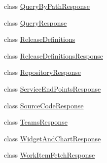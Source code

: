 \begin{DoxyCompactItemize}
\item 
class \mbox{\hyperlink{class_templates_generator_tool_1_1_view_model_1_1_query_by_path_response}{Query\+By\+Path\+Response}}
\item 
class \mbox{\hyperlink{class_templates_generator_tool_1_1_view_model_1_1_query_response}{Query\+Response}}
\item 
class \mbox{\hyperlink{class_templates_generator_tool_1_1_view_model_1_1_release_definitions}{Release\+Definitions}}
\item 
class \mbox{\hyperlink{class_templates_generator_tool_1_1_view_model_1_1_release_definitions_response}{Release\+Definitions\+Response}}
\item 
class \mbox{\hyperlink{class_templates_generator_tool_1_1_view_model_1_1_repository_response}{Repository\+Response}}
\item 
class \mbox{\hyperlink{class_templates_generator_tool_1_1_view_model_1_1_service_end_points_response}{Service\+End\+Points\+Response}}
\item 
class \mbox{\hyperlink{class_templates_generator_tool_1_1_view_model_1_1_source_code_response}{Source\+Code\+Response}}
\item 
class \mbox{\hyperlink{class_templates_generator_tool_1_1_view_model_1_1_teams_response}{Teams\+Response}}
\item 
class \mbox{\hyperlink{class_templates_generator_tool_1_1_view_model_1_1_widget_and_chart_response}{Widget\+And\+Chart\+Response}}
\item 
class \mbox{\hyperlink{class_templates_generator_tool_1_1_view_model_1_1_work_item_fetch_response}{Work\+Item\+Fetch\+Response}}
\end{DoxyCompactItemize}
